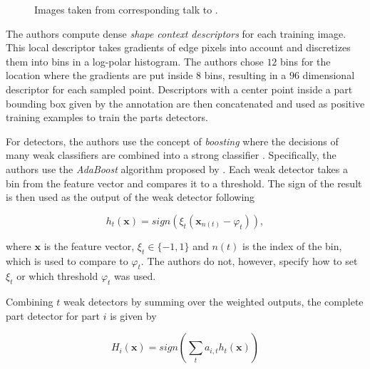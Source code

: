 \begin{figure}
    \centering
    \hspace{20px}
    \caption{Images taken from corresponding talk to \cite{andriluka_pictorial_2009}.}
\end{figure}

The authors compute dense \textit{shape context descriptors} \cite{belongie_shape_2002} for each training image.
This local descriptor takes gradients of edge pixels into account and discretizes them into bins in a log-polar histogram.
The authors chose $12$ bins for the location where the gradients are put inside $8$ bins, resulting in a $96$ dimensional descriptor for each sampled point.
Descriptors with a center point inside a part bounding box given by the annotation are then concatenated and used as positive training examples to train the parts detectors.

For detectors, the authors use the concept of \textit{boosting} where the decisions of many weak classifiers are combined into a strong classifier \cite{freund_short_1999}.
Specifically, the authors use the \textit{AdaBoost} algorithm proposed by \cite{freund_decision-theoretic_1997}.
Each weak detector takes a bin from the feature vector and compares it to a threshold.
The sign of the result is then used as the output of the weak detector following

\begin{equation}
    h_t(\bm{x}) = sign(\xi_t (\bm{x}_{n(t)} - \varphi_t )),
\end{equation}

where $\bm{x}$ is the feature vector, $\xi_t \in \{-1, 1\}$ and $n(t)$ is the index of the bin, which is used to compare to $\varphi_t$.
The authors do not, however, specify how to set $\xi_t$ or which threshold $\varphi_t$ was used.

Combining $t$ weak detectors by summing over the weighted outputs, the complete part detector for part $i$ is given by 

\begin{equation}
    H_i(\bm{x}) = sign\left(\sum_t a_{i,t} h_t(\bm{x})\right)
\end{equation}


